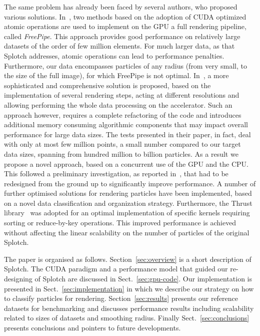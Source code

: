 \documentclass[preprint,5pt]{elsarticle}
\begin{document}
The same problem has already been faced by several authors, who proposed various solutions. In~\cite{liu2010}, two methods based on 
the adoption of CUDA optimized atomic operations are used to implement on the GPU a full rendering pipeline, called {\it FreePipe}. 
This approach provides good performance on relatively large datasets of the order of few million elements.
For much larger data, as that Splotch addresses, atomic operations 
can lead to performance penalties. Furthermore, our data encompasses particles of any radius (from very small, to the size of the full image),
for which FreePipe is not optimal. In~\cite{laine2011}, a more sophisticated and comprehensive solution
is proposed, based on the implementation of several rendering steps, acting at different resolutions and allowing performing the whole
data processing on the accelerator. 
Such an approach however, requires a complete refactoring of the code and introduces additional memory consuming algorithmic components that may impact overall performance for large data sizes. 
The tests presented in their paper, in fact, 
deal with only at most few million points, a small number 
compared to our target data sizes, spanning from hundred million to billion particles.
As a result we propose a novel approach, based on a concurrent use of the GPU and the CPU.
This followed a
preliminary investigation, as reported in~\cite{jin:high-performance}, that 
had to be redesigned from the ground up to significantly improve performance. A number of further 
optimised solutions for rendering particles have been implemented, based on a novel data classification and organization strategy. Furthermore, the Thrust library~\cite{thrusturl} was adopted for an optimal implementation of specific kernels requiring sorting or reduce-by-key operations.
This improved performance is achieved without affecting the linear scalability on the number of particles of the original Splotch. 

The paper is organised as follows. 
Section~\ref{sec:overview} is a short description of Splotch. The CUDA paradigm and a performance model that guided our re-designing of Splotch are discussed in Sect.~\ref{sec:gpu-code}. Our implementation is presented in Sect.~\ref{sec:implementation} in which we describe our strategy on how to classify particles for rendering. Section~\ref{sec:results} presents our reference datasets for benchmarking and discusses performance results including scalability related to sizes of datasets and smoothing radius. Finally Sect.~\ref{sec:conclusions} presents conclusions and pointers to future developments.
\end{document}
